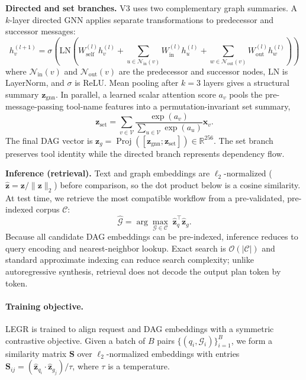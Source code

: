 \documentclass{article}
\begin{document}
\textbf{Directed and set branches.} V3 uses two complementary graph summaries. A $k$-layer directed GNN applies separate transformations to predecessor and successor messages:
\begin{equation}
h_v^{(l+1)} = \sigma \left( \text{LN} \left( W_{\text{self}}^{(l)} h_v^{(l)} + \sum_{u \in \mathcal{N}_{\text{in}}(v)} W_{\text{in}}^{(l)} h_u^{(l)} + \sum_{w \in \mathcal{N}_{\text{out}}(v)} W_{\text{out}}^{(l)} h_w^{(l)} \right) \right)
\end{equation}
where $\mathcal{N}_{\text{in}}(v)$ and $\mathcal{N}_{\text{out}}(v)$ are the predecessor and successor nodes, $\text{LN}$ is LayerNorm, and $\sigma$ is ReLU. Mean pooling after $k=3$ layers gives a structural summary $\mathbf{z}_{\mathrm{gnn}}$. In parallel, a learned scalar attention score $a_v$ pools the pre-message-passing tool-name features into a permutation-invariant set summary,
\begin{equation}
\mathbf{z}_{\mathrm{set}}=\sum_{v\in\mathcal{V}}\frac{\exp(a_v)}{\sum_{u\in\mathcal{V}}\exp(a_u)}\mathbf{x}_v.
\end{equation}
The final DAG vector is $\mathbf{z}_g=\operatorname{Proj}([\mathbf{z}_{\mathrm{gnn}};\mathbf{z}_{\mathrm{set}}])\in\mathbb{R}^{256}$. The set branch preserves tool identity while the directed branch represents dependency flow.

\textbf{Inference (retrieval).} Text and graph embeddings are $\ell_2$-normalized ($\hat{\mathbf{z}} = \mathbf{z} / \|\mathbf{z}\|_2$) before comparison, so the dot product below is a cosine similarity. At test time, we retrieve the most compatible workflow from a pre-validated, pre-indexed corpus $\mathcal{C}$:
\begin{equation}
\hat{\mathcal{G}} = \arg\max_{\mathcal{G} \in \mathcal{C}} \; \hat{\mathbf{z}}_q^\top \hat{\mathbf{z}}_g.
\end{equation}
Because all candidate DAG embeddings can be pre-indexed, inference reduces to query encoding and nearest-neighbor lookup. Exact search is $\mathcal{O}(|\mathcal{C}|)$ and standard approximate indexing can reduce search complexity; unlike autoregressive synthesis, retrieval does not decode the output plan token by token.

\paragraph{Training objective.} LEGR is trained to align request and DAG embeddings with a symmetric contrastive objective. Given a batch of $B$ pairs $\{(q_i, \mathcal{G}_i)\}_{i=1}^B$, we form a similarity matrix $\mathbf{S}$ over $\ell_2$-normalized embeddings with entries $\mathbf{S}_{ij} = (\hat{\mathbf{z}}_{q_i} \cdot \hat{\mathbf{z}}_{g_j}) / \tau$, where $\tau$ is a temperature.
\end{document}
